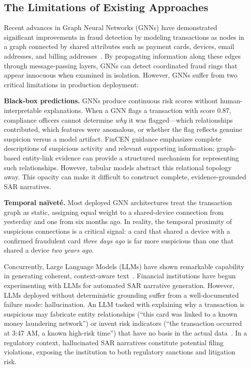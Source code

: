 \documentclass[journal]{IEEEtran}
\begin{document}
\subsection{The Limitations of Existing Approaches}

Recent advances in Graph Neural Networks (GNNs) have demonstrated significant improvements in fraud detection by modeling transactions as nodes in a graph connected by shared attributes such as payment cards, devices, email addresses, and billing addresses~\cite{zhang2019hetgnn, dou2020care}. By propagating information along these edges through message-passing layers, GNNs can detect coordinated fraud rings that appear innocuous when examined in isolation. However, GNNs suffer from two critical limitations in production deployment:

\textbf{Black-box predictions.} GNNs produce continuous risk scores without human-interpretable explanations. When a GNN flags a transaction with score 0.87, compliance officers cannot determine \emph{why} it was flagged---which relationships contributed, which features were anomalous, or whether the flag reflects genuine suspicion versus a model artifact. FinCEN guidance emphasizes complete descriptions of suspicious activity and relevant supporting information; graph-based entity-link evidence can provide a structured mechanism for representing such relationships. However, tabular models abstract this relational topology away. This opacity can make it difficult to construct complete, evidence-grounded SAR narratives.

\textbf{Temporal na\"{i}vet\'{e}.} Most deployed GNN architectures treat the transaction graph as static, assigning equal weight to a shared-device connection from yesterday and one from six months ago. In reality, the temporal proximity of suspicious connections is a critical signal: a card that shared a device with a confirmed fraudulent card \emph{three days ago} is far more suspicious than one that shared a device \emph{two years ago}.

Concurrently, Large Language Models (LLMs) have shown remarkable capability in generating coherent, context-aware text~\cite{achiam2023gpt4}. Financial institutions have begun experimenting with LLMs for automated SAR narrative generation. However, LLMs deployed without deterministic grounding suffer from a well-documented failure mode: hallucination. An LLM tasked with explaining why a transaction is suspicious may fabricate entity relationships (``this card was linked to a known money laundering network'') or invent risk indicators (``the transaction occurred at 3:47 AM, a known high-risk time'') that have no basis in the actual data~\cite{ji2023hallucination}. In a regulatory context, hallucinated SAR narratives constitute potential filing violations, exposing the institution to both regulatory sanctions and litigation risk.
\end{document}
